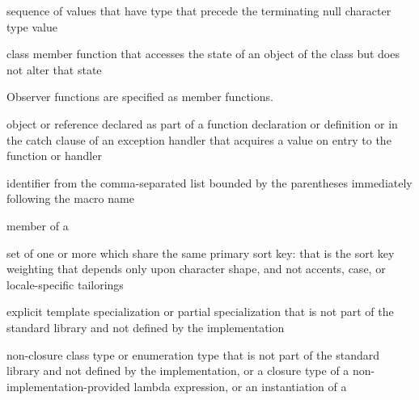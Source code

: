 %
%
sequence of values that have
 type
that precede the terminating null character type
value

%
class member function that accesses the state of an object of the class
but does not alter that state

\begin{defnote}
Observer functions are specified as
member functions.
\end{defnote}

%
%
%
 object or reference declared as part of a function declaration or
definition or in the catch clause of an exception handler that
acquires a value on entry to the function or handler

%
%
 identifier from
the comma-separated list bounded by the parentheses immediately
following the macro name

%
%
 member of a 

%
set of one or more  which
share the same primary sort key: that is the sort key weighting that
depends only upon character shape, and not accents, case, or
locale-specific tailorings

%
explicit template specialization or partial specialization
that is not part of the \Cpp{} standard library and
not defined by the implementation

%
non-closure class type or enumeration type
that is not part of the \Cpp{} standard library and
not defined by the implementation,
or a closure type of a non-implementation-provided lambda expression,
or an instantiation of a 


